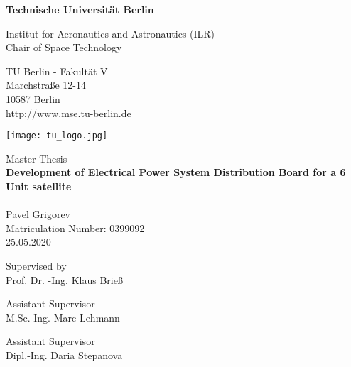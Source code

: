 \thispagestyle{empty}
\begin{center}

\vspace{1.0cm}
{\LARGE \textbf{Technische Universität Berlin}}

\vspace{0.5cm}

{\large Institut for Aeronautics and Astronautics (ILR)\\[1mm]}
{\large Chair of Space Technology\\[5mm]}

TU Berlin - Fakultät V\\
Marchstraße 12-14\\
10587 Berlin\\
http://www.mse.tu-berlin.de\\

\vspace*{1cm}

\texttt{[image: tu\_logo.jpg]}

\vspace*{1.0cm}

{\LARGE Master Thesis}\\

\vspace{1.0cm}
{\LARGE \textbf{Development of  Electrical Power System Distribution Board for a 6 Unit satellite}}\\
\vspace*{0.3cm}
{\LARGE \textbf{}}\\
\vspace*{1.0cm}
{\LARGE Pavel Grigorev}
\\
\vspace*{0.5cm}
Matriculation Number: 0399092\\
25.05.2020\\ %
\vspace*{1.0cm}


Supervised by\\
Prof. Dr. -Ing. Klaus Brieß\\
\vspace*{0.5cm}

Assistant Supervisor\\
M.Sc.-Ing. Marc Lehmann
\vspace*{0.5cm}

Assistant Supervisor\\
Dipl.-Ing. Daria Stepanova
\vspace{3cm}




\end{center}

